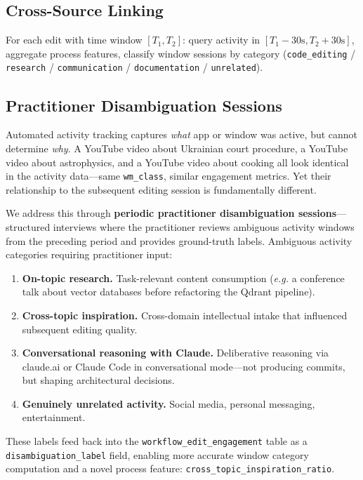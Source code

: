 \documentclass[11pt]{article}
\makeatletter
\newcommand{\eg}{\emph{e.g.}\@\xspace}
\makeatother
\begin{document}
\subsection{Cross-Source Linking}
\label{sec:cross-source}

For each edit with time window $[T_1, T_2]$: query activity in $[T_1 - 30\text{s}, T_2 + 30\text{s}]$, aggregate process features, classify window sessions by category (\texttt{code\_editing} / \texttt{research} / \texttt{communication} / \texttt{documentation} / \texttt{unrelated}).

\subsection{Practitioner Disambiguation Sessions}
\label{sec:disambiguation}

Automated activity tracking captures \emph{what} app or window was active, but cannot determine \emph{why}.
A YouTube video about Ukrainian court procedure, a YouTube video about astrophysics, and a YouTube video about cooking all look identical in the activity data---same \texttt{wm\_class}, similar engagement metrics.
Yet their relationship to the subsequent editing session is fundamentally different.

We address this through \textbf{periodic practitioner disambiguation sessions}---structured interviews where the practitioner reviews ambiguous activity windows from the preceding period and provides ground-truth labels.
Ambiguous activity categories requiring practitioner input:

\begin{enumerate}[nosep,label=(\alph*)]
  \item \textbf{On-topic research.} Task-relevant content consumption (\eg a conference talk about vector databases before refactoring the Qdrant pipeline).
  \item \textbf{Cross-topic inspiration.} Cross-domain intellectual intake that influenced subsequent editing quality.
  \item \textbf{Conversational reasoning with Claude.} Deliberative reasoning via claude.ai or Claude Code in conversational mode---not producing commits, but shaping architectural decisions.
  \item \textbf{Genuinely unrelated activity.} Social media, personal messaging, entertainment.
\end{enumerate}

These labels feed back into the \texttt{workflow\_edit\_engagement} table as a \texttt{disambiguation\_label} field, enabling more accurate window category computation and a novel process feature: \texttt{cross\_topic\_inspiration\_ratio}.
\end{document}
